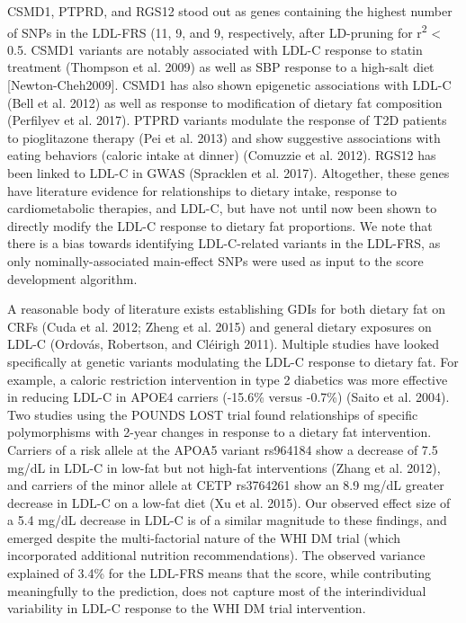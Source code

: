 \documentclass[]{article}
\begin{document}
CSMD1, PTPRD, and RGS12 stood out as genes containing the highest number
of SNPs in the LDL-FRS (11, 9, and 9, respectively, after LD-pruning for
r\textsuperscript{2} \textless{} 0.5. CSMD1 variants are notably
associated with LDL-C response to statin treatment (Thompson et al.
2009) as well as SBP response to a high-salt diet {[}Newton-Cheh2009{]}.
CSMD1 has also shown epigenetic associations with LDL-C (Bell et al.
2012) as well as response to modification of dietary fat composition
(Perfilyev et al. 2017). PTPRD variants modulate the response of T2D
patients to pioglitazone therapy (Pei et al. 2013) and show suggestive
associations with eating behaviors (caloric intake at dinner) (Comuzzie
et al. 2012). RGS12 has been linked to LDL-C in GWAS (Spracklen et al.
2017). Altogether, these genes have literature evidence for
relationships to dietary intake, response to cardiometabolic therapies,
and LDL-C, but have not until now been shown to directly modify the
LDL-C response to dietary fat proportions. We note that there is a bias
towards identifying LDL-C-related variants in the LDL-FRS, as only
nominally-associated main-effect SNPs were used as input to the score
development algorithm.

A reasonable body of literature exists establishing GDIs for both
dietary fat on CRFs (Cuda et al. 2012; Zheng et al. 2015) and general
dietary exposures on LDL-C (Ordovás, Robertson, and Cléirigh 2011).
Multiple studies have looked specifically at genetic variants modulating
the LDL-C response to dietary fat. For example, a caloric restriction
intervention in type 2 diabetics was more effective in reducing LDL-C in
APOE4 carriers (-15.6\% versus -0.7\%) (Saito et al. 2004). Two studies
using the POUNDS LOST trial found relationships of specific
polymorphisms with 2-year changes in response to a dietary fat
intervention. Carriers of a risk allele at the APOA5 variant rs964184
show a decrease of 7.5 mg/dL in LDL-C in low-fat but not high-fat
interventions (Zhang et al. 2012), and carriers of the minor allele at
CETP rs3764261 show an 8.9 mg/dL greater decrease in LDL-C on a low-fat
diet (Xu et al. 2015). Our observed effect size of a 5.4 mg/dL decrease
in LDL-C is of a similar magnitude to these findings, and emerged
despite the multi-factorial nature of the WHI DM trial (which
incorporated additional nutrition recommendations). The observed
variance explained of 3.4\% for the LDL-FRS means that the score, while
contributing meaningfully to the prediction, does not capture most of
the interindividual variability in LDL-C response to the WHI DM trial
intervention.
\end{document}
